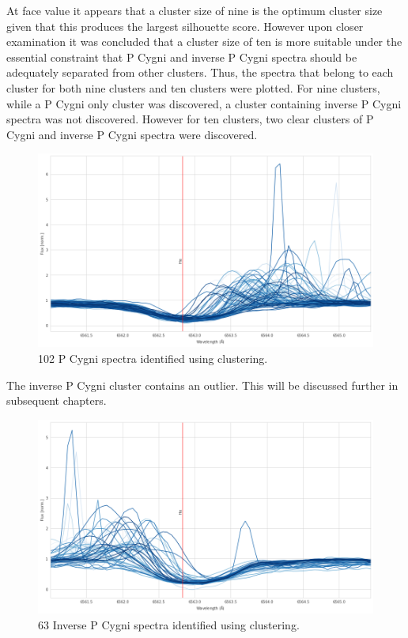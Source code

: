 At face value it appears that a cluster size of nine is the optimum cluster size given that this produces the largest silhouette score. However upon closer examination it was concluded that a cluster size of ten is more suitable under the essential constraint that P Cygni and inverse P Cygni spectra should be adequately separated from other clusters. Thus, the spectra that belong to each cluster for both nine clusters and ten clusters were plotted. For nine clusters, while a P Cygni only cluster was discovered, a cluster containing inverse P Cygni spectra was not discovered. However for ten clusters, two clear clusters of P Cygni and inverse P Cygni spectra were discovered.

\begin{figure}[h]
\centering
\includegraphics[scale=0.45]{figures/pcygni.png}
\caption{102 P Cygni spectra identified using clustering.}
\end{figure}

The inverse P Cygni cluster contains an outlier. This will be discussed further in subsequent chapters.

\begin{figure}[h]
\centering
\includegraphics[scale=0.45]{figures/inverse p cygni.png}
\caption{63 Inverse P Cygni spectra identified using clustering.}
\end{figure}











